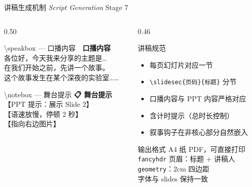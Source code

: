 \documentclass[aspectratio=169,10pt]{beamer}
\newcommand{\EN}[1]{\textit{#1}}
\newcommand{\sectag}[1]{\textmd{\small\normalfont\textcolor{deepblue!60}{#1}}}
\begin{document}
\begin{frame}{讲稿生成机制 \EN{Script Generation} \sectag{Stage 7}}
  \begin{columns}[T]
    \begin{column}{0.50\textwidth}
      \begin{block}{\small \textbackslash speakbox — 口播内容}
        \footnotesize\color{deepblue}
        \textbf{🎤 口播内容}\\[2pt]
        各位好，今天我来分享的主题是…\\
        在我们开始之前，先讲一个故事。\\
        这个故事发生在某个深夜的实验室……
      \end{block}
      \vspace{6pt}
      \begin{exampleblock}{\small \textbackslash notebox — 舞台提示}
        \footnotesize\color{darkgray}
        \textbf{📋 舞台提示}\\[2pt]
        【PPT 提示：展示 Slide 2】\\
        【语速放慢，停顿 2 秒】\\
        【指向右边图片】
      \end{exampleblock}
    \end{column}
    \begin{column}{0.46\textwidth}
      \begin{alertblock}{\small 讲稿规范}
        \footnotesize
        \begin{itemize}
          \item 每页幻灯片对应一节
          \item \texttt{\textbackslash slidesec\{页码\}\{标题\}} 分节
          \item 口播内容与 PPT 内容严格对应
          \item 含计时提示（总时长控制）
          \item 叙事钩子在非核心部分自然嵌入
        \end{itemize}
      \end{alertblock}
      \vspace{4pt}
      \begin{block}{\small 输出格式}
        \footnotesize
        A4 纸 PDF，可直接打印\\
        \texttt{fancyhdr} 页眉：标题 + 讲稿人\\
        \texttt{geometry}：2cm 四边距\\
        字体与 slides 保持一致
      \end{block}
    \end{column}
  \end{columns}
\end{frame}
\end{document}
